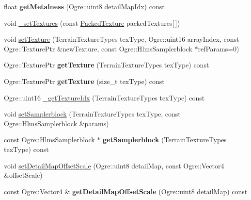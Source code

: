 \begin{DoxyCompactItemize}
\item 
\mbox{\label{class_hlms_terrain_datablock_a480b9b9deea9bc4571c80a63e3b0d93a}} 
float {\bfseries get\+Metalness} (Ogre\+::uint8 detail\+Map\+Idx) const
\item 
void \hyperlink{class_hlms_terrain_datablock_a9491ff27ef7052bcce3edb825acc61fe}{\+\_\+set\+Textures} (const \hyperlink{struct_packed_texture}{Packed\+Texture} packed\+Textures\mbox{[}$\,$\mbox{]})
\item 
void \hyperlink{class_hlms_terrain_datablock_a1b27f8fe762d440e239b082b063dccc3}{set\+Texture} (Terrain\+Texture\+Types tex\+Type, Ogre\+::uint16 array\+Index, const Ogre\+::\+Texture\+Ptr \&new\+Texture, const Ogre\+::\+Hlms\+Samplerblock $\ast$ref\+Params=0)
\item 
\mbox{\label{class_hlms_terrain_datablock_a47f8cb14b8db112c3a0e0c312d6c9ea4}} 
Ogre\+::\+Texture\+Ptr {\bfseries get\+Texture} (Terrain\+Texture\+Types tex\+Type) const
\item 
\mbox{\label{class_hlms_terrain_datablock_ac03d887ccfb90caa3926b724c6b40d03}} 
Ogre\+::\+Texture\+Ptr {\bfseries get\+Texture} (size\+\_\+t tex\+Type) const
\item 
Ogre\+::uint16 \hyperlink{class_hlms_terrain_datablock_af9f5260f2d4238492c9ef2d78e1bc0cb}{\+\_\+get\+Texture\+Idx} (Terrain\+Texture\+Types tex\+Type) const
\item 
void \hyperlink{class_hlms_terrain_datablock_a4e7f40cdd79957bdbfbfd77ecd511c9a}{set\+Samplerblock} (Terrain\+Texture\+Types tex\+Type, const Ogre\+::\+Hlms\+Samplerblock \&params)
\item 
\mbox{\label{class_hlms_terrain_datablock_a2744e6ade914ee6235ac06e6aac8d390}} 
const Ogre\+::\+Hlms\+Samplerblock $\ast$ {\bfseries get\+Samplerblock} (Terrain\+Texture\+Types tex\+Type) const
\item 
void \hyperlink{class_hlms_terrain_datablock_af4b0ac3a3030192a4bb2200567dcc1fd}{set\+Detail\+Map\+Offset\+Scale} (Ogre\+::uint8 detail\+Map, const Ogre\+::\+Vector4 \&offset\+Scale)
\item 
\mbox{\label{class_hlms_terrain_datablock_a23befce55b5f98b30a49881ba9fd3262}} 
const Ogre\+::\+Vector4 \& {\bfseries get\+Detail\+Map\+Offset\+Scale} (Ogre\+::uint8 detail\+Map) const

\end{DoxyCompactItemize}
